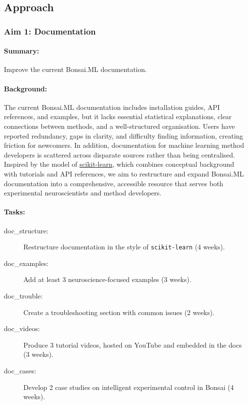 
\subsection{Approach}

\subsubsection{Aim 1: Documentation}

\paragraph{Summary:} Improve the current Bonsai.ML documentation.

\paragraph{Background:}
The current Bonsai.ML documentation includes installation guides, API
references, and examples, but it lacks essential statistical explanations,
clear connections between methods, and a well-structured organisation. Users
have reported redundancy, gaps in clarity, and difficulty finding information,
creating friction for newcomers. In addition, documentation for machine
learning method developers is scattered across disparate sources rather than
being centralised. Inspired by the model of
\href{https://scikit-learn.org/}{scikit-learn}, which combines conceptual
background with tutorials and API references, we aim to restructure and expand
Bonsai.ML documentation into a comprehensive, accessible resource that serves
both experimental neuroscientists and method developers.

\paragraph{Tasks:}  

\begin{description}
    \item[doc\_structure:] Restructure documentation in the style of \texttt{scikit-learn} (4 weeks).  
    \item[doc\_examples:] Add at least 3 neuroscience-focused examples (3 weeks).  
    \item[doc\_trouble:] Create a troubleshooting section with common issues (2 weeks).  
    \item[doc\_videos:] Produce 3 tutorial videos, hosted on YouTube and embedded in the docs (3 weeks).  
    \item[doc\_cases:] Develop 2 case studies on intelligent experimental control in Bonsai (4 weeks).  
\end{description}  

